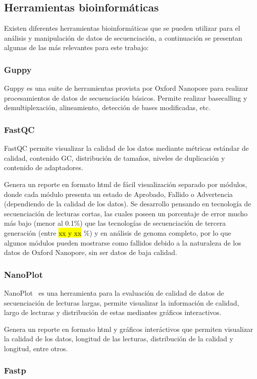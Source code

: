 \subsection{Herramientas bioinformáticas}
Existen diferentes herramientas bioinformáticas que se pueden utilizar para el análisis y manipulación de datos de secuenciación, a continuación se presentan algunas de las más relevantes para este trabajo:

\subsubsection{Guppy}
Guppy es una suite de herramientas provista por Oxford Nanopore para realizar procesamientos de datos de secuenciación básicos. Permite realizar basecalling y demultiplexación, alineamiento, detección de bases modificadas, etc.
\subsubsection{FastQC}
FastQC\cite{andrews2010fastqc} permite visualizar la calidad de los datos mediante métricas estándar de calidad, contenido GC, distribución de tamaños, niveles de duplicación  y contenido de adaptadores.


Genera un reporte en formato html de fácil visualización separado por módulos, donde cada módulo presenta un estado de Aprobado, Fallido o Advertencia (dependiendo de la calidad de los datos). Se desarrollo pensando en tecnología de secuenciación de lecturas cortas, las cuales poseen un porcentaje de error mucho más bajo (menor al 0.1\%) que las tecnologías de secuenciación de tercera generación (entre \hl{xx y xx} \%) y en análisis de genoma completo, por lo que algunos módulos pueden mostrarse como fallidos debido a la naturaleza de los datos de Oxford Nanopore, sin ser datos de baja calidad.
\subsubsection{NanoPlot}
NanoPlot~\cite{10.1093/bioinformatics/btad311} es una herramienta para la evaluación de calidad de datos de secuenciación de lecturas largas, permite visualizar la información de calidad, largo de lecturas y distribución de estas mediantes gráficos interactivos.

Genera un reporte en formato html y gráficos interáctivos que permiten visualizar la calidad de los datos, longitud de las lecturas, distribución de la calidad y longitud, entre otros.
\subsubsection{Fastp}

